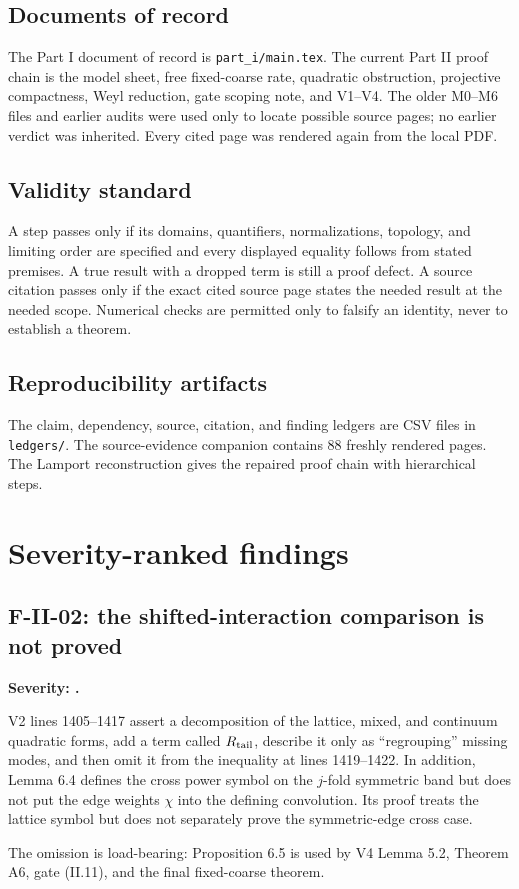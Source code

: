 \documentclass[11pt,a4paper]{article}
\begin{document}
\subsection{Documents of record}

The Part I document of record is \texttt{part\_i/main.tex}.  The current Part II proof
chain is the model sheet, free fixed-coarse rate, quadratic obstruction, projective
compactness, Weyl reduction, gate scoping note, and V1--V4.  The older M0--M6 files and
earlier audits were used only to locate possible source pages; no earlier verdict was
inherited.  Every cited page was rendered again from the local PDF.

\subsection{Validity standard}

A step passes only if its domains, quantifiers, normalizations, topology, and limiting
order are specified and every displayed equality follows from stated premises.  A true
result with a dropped term is still a proof defect.  A source citation passes only if
the exact cited source page states the needed result at the needed scope.  Numerical
checks are permitted only to falsify an identity, never to establish a theorem.

\subsection{Reproducibility artifacts}

The claim, dependency, source, citation, and finding ledgers are CSV files in
\texttt{ledgers/}.  The source-evidence companion contains 88 freshly rendered pages.
The Lamport reconstruction gives the repaired proof chain with hierarchical steps.

\section{Severity-ranked findings}

\subsection{F-II-02: the shifted-interaction comparison is not proved}

\begin{finding}
\textbf{Severity: \Critical.}

V2 lines 1405--1417 assert a decomposition of the lattice, mixed, and continuum
quadratic forms, add a term called $R_{\rm tail}$, describe it only as ``regrouping''
missing modes, and then omit it from the inequality at lines 1419--1422.  In addition,
Lemma 6.4 defines the cross power symbol on the $j$-fold symmetric band but does not
put the edge weights $\chi$ into the defining convolution.  Its proof treats the
lattice symbol but does not separately prove the symmetric-edge cross case.

The omission is load-bearing: Proposition 6.5 is used by V4 Lemma 5.2, Theorem A6,
gate (II.11), and the final fixed-coarse theorem.
\end{finding}
\end{document}
